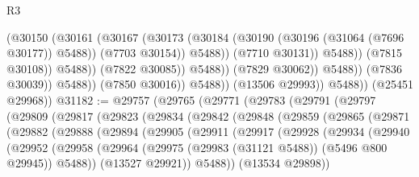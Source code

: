 \begin{lexlean}{R3}
\begin{coremodule}
                                            (@30150
                                              (@30161
                                                (@30167
                                                  (@30173
                                                    (@30184
                                                      (@30190
                                                        (@30196 (@31064 (@7696 @30177)) @5488))
                                                      (@7703 @30154))
                                                    @5488))
                                                (@7710 @30131))
                                              @5488))
                                          (@7815 @30108))
                                        @5488))
                                    (@7822 @30085))
                                  @5488))
                              (@7829 @30062))
                            @5488))
                        (@7836 @30039))
                      @5488))
                  (@7850 @30016))
                @5488))
            (@13506 @29993))
          @5488))
      (@25451 @29968))
@31182 := @29757
    (@29765
      (@29771
        (@29783
          (@29791
            (@29797
              (@29809
                (@29817
                  (@29823
                    (@29834
                      (@29842
                        (@29848
                          (@29859
                            (@29865
                              (@29871
                                (@29882
                                  (@29888
                                    (@29894
                                      (@29905
                                        (@29911
                                          (@29917
                                            (@29928
                                              (@29934
                                                (@29940
                                                  (@29952
                                                    (@29958
                                                      (@29964
                                                        (@29975
                                                          (@29983 (@31121 @5488))
                                                          (@5496 @800 @29945))
                                                        @5488))
                                                    (@13527 @29921))
                                                  @5488))
                                              (@13534 @29898))

\end{coremodule}
\end{lexlean}

